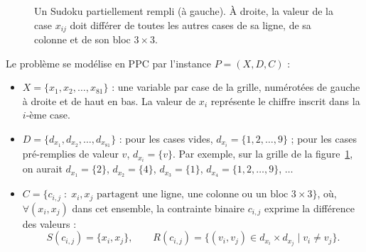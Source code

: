 \documentclass[11pt,a4paper]{article}
\begin{document}
\begin{figure}[h]
\centering
{}
\hspace{0.6cm}
\caption{Un Sudoku partiellement rempli (à gauche). À droite, la valeur
de la case $x_{ij}$ doit différer de toutes les autres cases de sa
ligne, de sa colonne et de son bloc $3 \times 3$.}
\label{fig:sudoku}
\end{figure}

Le problème se modélise en PPC par l'instance $P = (X, D, C)$ :
\begin{itemize}
  \item $X = \{x_1, x_2, \dots, x_{81}\}$ : une variable par case de la
    grille, numérotées de gauche à droite et de haut en bas. La valeur
    de $x_i$ représente le chiffre inscrit dans la $i$-ème case.
  \item $D = \{d_{x_1}, d_{x_2}, \dots, d_{x_{81}}\}$ : pour les cases
    vides, $d_{x_i} = \{1, 2, \dots, 9\}$ ; pour les cases pré-remplies
    de valeur $v$, $d_{x_i} = \{v\}$. Par exemple, sur la grille de la
    figure~\ref{fig:sudoku}, on aurait
    $d_{x_1} = \{2\}$, $d_{x_2} = \{4\}$, $d_{x_3} = \{1\}$,
    $d_{x_4} = \{1, 2, \dots, 9\}$, $\ldots$
  \item $C = \{c_{i,j} \;:\; x_i, x_j \text{ partagent une ligne, une
    colonne ou un bloc } 3 \times 3\}$, où, $\forall (x_i, x_j)$ dans
    cet ensemble, la contrainte binaire $c_{i,j}$ exprime la différence
    des valeurs :
    \[
      S(c_{i,j}) = \{x_i, x_j\}, \qquad
      R(c_{i,j}) = \{(v_i, v_j) \in d_{x_i} \times d_{x_j}
        \mid v_i \neq v_j\}.
    \]
\end{itemize}
\end{document}
